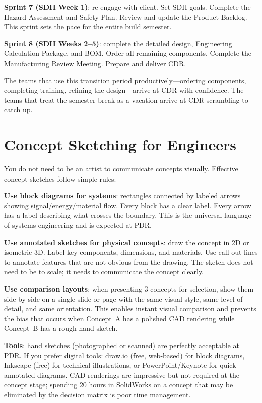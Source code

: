 \textbf{Sprint 7 (SDII Week 1)}: re-engage with client. Set SDII goals. Complete the Hazard Assessment and Safety Plan. Review and update the Product Backlog. This sprint sets the pace for the entire build semester.

\textbf{Sprint 8 (SDII Weeks 2--5)}: complete the detailed design, Engineering Calculation Package, and BOM. Order all remaining components. Complete the Manufacturing Review Meeting. Prepare and deliver CDR.

The teams that use this transition period productively---ordering components, completing training, refining the design---arrive at CDR with confidence. The teams that treat the semester break as a vacation arrive at CDR scrambling to catch up.



\section{Concept Sketching for Engineers}
You do not need to be an artist to communicate concepts visually. Effective concept sketches follow simple rules:

\textbf{Use block diagrams for systems}: rectangles connected by labeled arrows showing signal/energy/material flow. Every block has a clear label. Every arrow has a label describing what crosses the boundary. This is the universal language of systems engineering and is expected at PDR.

\textbf{Use annotated sketches for physical concepts}: draw the concept in 2D or isometric 3D. Label key components, dimensions, and materials. Use call-out lines to annotate features that are not obvious from the drawing. The sketch does not need to be to scale; it needs to communicate the concept clearly.

\textbf{Use comparison layouts}: when presenting 3 concepts for selection, show them side-by-side on a single slide or page with the same visual style, same level of detail, and same orientation. This enables instant visual comparison and prevents the bias that occurs when Concept~A has a polished CAD rendering while Concept~B has a rough hand sketch.

\textbf{Tools}: hand sketches (photographed or scanned) are perfectly acceptable at PDR. If you prefer digital tools: draw.io (free, web-based) for block diagrams, Inkscape (free) for technical illustrations, or PowerPoint/Keynote for quick annotated diagrams. CAD renderings are impressive but not required at the concept stage; spending 20 hours in SolidWorks on a concept that may be eliminated by the decision matrix is poor time management.


